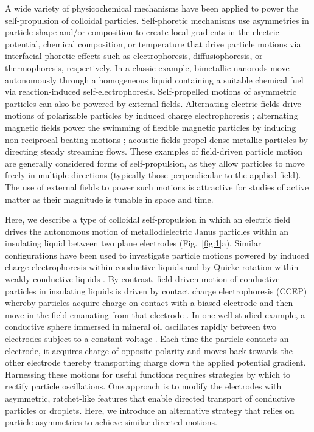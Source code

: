 A wide variety of physicochemical mechanisms have been applied to power the self-propulsion of colloidal particles.
Self-phoretic mechanisms\cite{Golestanian2007} use asymmetries in particle shape and/or composition to create local gradients in the electric potential\cite{Brown2014}, chemical composition\cite{Howse2007}, or temperature\cite{Jiang2010} that drive particle motions via interfacial phoretic effects such as electrophoresis, diffusiophoresis, or thermophoresis, respectively\cite{Anderson1989}.
In a classic example\cite{Paxton2004,Fournier-Bidoz2005}, bimetallic nanorods move autonomously through a homogeneous liquid containing a suitable chemical fuel via reaction-induced  self-electrophoresis\cite{Wang2006,Moran2010}. 
Self-propelled motions of asymmetric particles can also be powered by external fields.
Alternating electric fields drive motions of polarizable particles by induced charge electrophoresis \cite{Squires2006,Gangwal2008,Boymelgreen2014}; alternating magnetic fields power the swimming of flexible magnetic particles by inducing non-reciprocal beating motions \cite{Dreyfus2005}; acoustic fields propel dense metallic particles by directing steady streaming flows\cite{Wang2012,Nadal2014,Ahmed2015}. 
These examples of field-driven particle motion are generally considered forms of self-propulsion, as they allow particles to move freely in multiple directions (typically those perpendicular to the applied field).
The use of external fields to power such motions is attractive for studies of active matter as their magnitude is tunable in space and time.

Here, we describe a type of colloidal self-propulsion in which an electric field drives the autonomous motion of metallodielectric Janus particles\cite{Perro2005,Pawar2008} within an insulating liquid between two plane electrodes (Fig.~\ref{fig:1}a).
Similar configurations have been used to investigate particle motions powered by induced charge electrophoresis within conductive liquids\cite{Boymelgreen2014} and by Quicke rotation within weakly conductive liquids \cite{Bricard2013}.
By contrast, field-driven  motion of conductive particles in insulating liquids is driven by contact charge electrophoresis (CCEP) whereby particles acquire charge on contact with a biased electrode and then move in the field emanating from that electrode \cite{drews2013ratcheted,cartier2014microfluidic,drews2015contact}.
In one well studied example, a conductive sphere immersed in mineral oil oscillates rapidly between two electrodes subject to a constant voltage \cite{drews2015contact}.
Each time the particle contacts an electrode, it acquires charge of opposite polarity and moves back towards the other electrode thereby transporting charge down the applied potential gradient.
Harnessing these motions for useful functions requires strategies by which to rectify particle oscillations.
One approach is to modify the electrodes with asymmetric, ratchet-like features that enable directed transport of conductive particles\cite{drews2013ratcheted} or droplets\cite{Um2016}.
Here, we introduce an alternative strategy that relies on particle asymmetries to achieve similar directed motions.

